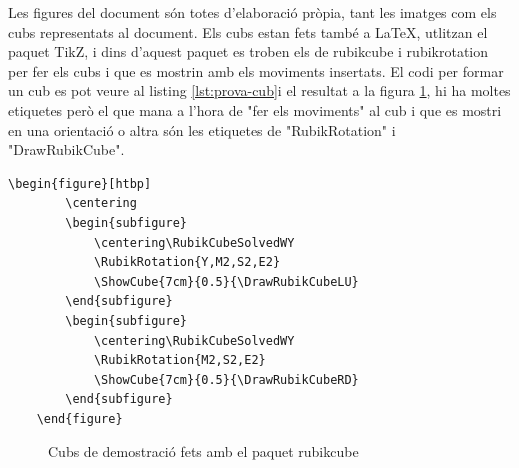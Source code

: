 Les figures del document són totes d'elaboració pròpia, tant les imatges com els cubs representats al document. 
Els cubs estan fets també a LaTeX, utlitzan el paquet TikZ, i dins d'aquest paquet es troben els de rubikcube i rubikrotation per fer els cubs i que es mostrin amb els moviments insertats.
El codi per formar un cub es pot veure al listing \ref{lst:prova-cub}i el resultat a la figura \ref{fig:prova-cub}, hi ha moltes etiquetes però el que mana a l'hora de "fer els moviments" al cub i que es mostri en una orientació o altra són les etiquetes de "RubikRotation" i "DrawRubikCube". 

\begin{lstlisting}[style=latex, caption={Exemple de Cubs fets amb el paquet rubikcube}, label={lst:prova-cub}]
    \begin{figure}[htbp]
        \centering
        \begin{subfigure}
            \centering\RubikCubeSolvedWY
            \RubikRotation{Y,M2,S2,E2}
            \ShowCube{7cm}{0.5}{\DrawRubikCubeLU}
        \end{subfigure}
        \begin{subfigure}
            \centering\RubikCubeSolvedWY
            \RubikRotation{M2,S2,E2}
            \ShowCube{7cm}{0.5}{\DrawRubikCubeRD}
        \end{subfigure}
    \end{figure}
\end{lstlisting}

\begin{figure}[htbp]
    \centering
    \begin{subfigure}
        \centering\RubikCubeSolvedWY
    \end{subfigure}
    \begin{subfigure}
        \centering\RubikCubeSolvedWY
    \end{subfigure}
    \label{fig:prova-cub}
    \caption{Cubs de demostració fets amb el paquet rubikcube}
\end{figure}
